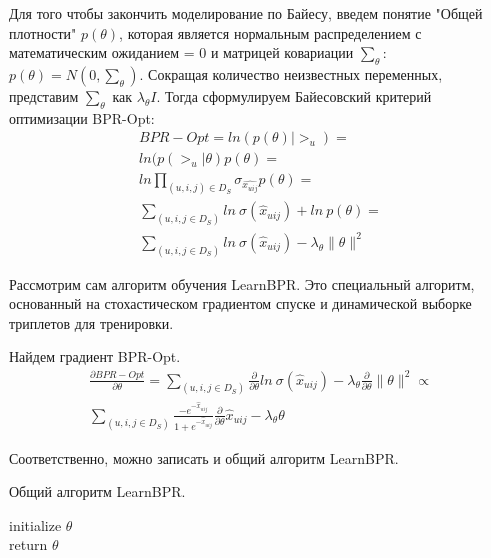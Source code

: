 \documentclass[14pt]{mmcs_article}
\begin{document}
Для того чтобы закончить моделирование по Байесу, введем понятие "Общей плотности" $ p(\theta) $, которая является нормальным распределением с математическим ожиданием = 0 и матрицей ковариации $ \sum_{\theta} $: $p(\theta) = N(0,\sum_{\theta})$.
Сокращая количество неизвестных переменных, представим $ \sum_{\theta} $ как $ \lambda_{\theta} I $. Тогда сформулируем Байесовский критерий оптимизации BPR-Opt:
\begin{equation}
	\begin{split}
		BPR-Opt = ln(p(\theta) |  >_u) = \\
		ln(p(>_u | \theta)p(\theta)	= \\
		ln \prod_{(u,i,j) \in D_S} \sigma_{\hat{x_{uij}}}p(\theta) = \\ 
		\sum_{(u,i,j \in D_S)}ln \ \sigma(\hat{x}_{uij}) + ln \  p(\theta) = \\
		\sum_{(u,i,j \in D_S)}ln \ \sigma(\hat{x}_{uij}) - \lambda_{\theta} \parallel \theta \parallel ^ 2
	\end{split}
\end{equation}

Рассмотрим сам алгоритм обучения LearnBPR. Это специальный алгоритм, основанный на стохастическом градиентом спуске и динамической выборке триплетов для тренировки.

Найдем градиент BPR-Opt.
\begin{multline}
	\frac{\partial BPR-Opt}{\partial \theta} = \sum_{(u,i,j \in D_S)} \frac{\partial}{\partial \theta} ln \ \sigma(\hat{x}_{uij}) - \lambda_{\theta} \frac{\partial}{\partial \theta} \parallel \theta \parallel ^ 2 \propto \\
	 \sum_{(u,i,j \in D_S)} \frac{- e^{-\hat{x}_{uij}}}{1 + e^{-\hat{x}_{uij}}} \frac{\partial}{\partial \theta} \hat{x}_{uij} - \lambda_{\theta} \theta
\end{multline}

Соответственно, можно записать и общий алгоритм LearnBPR.\\
\begin{algorithm}[H]\label{bpr:1}
	\caption{Общий алгоритм LearnBPR.}
	\KwOut{$\theta$}
	initialize $\theta$ \\
	return $\theta$
\end{algorithm}
\end{document}
